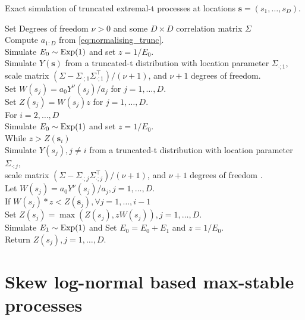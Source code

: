 \documentclass[lineno]{biometrika}
\begin{document}
\begin{algo}
\label{algo:trunc_extremal_t}
Exact simulation of truncated extremal-t processes at locations $\bm s = (s_1,\dots,s_D)$.
%
\begin{tabbing}
    \qquad \enspace Set Degrees of freedom $\nu>0$ and some $D\times D$ correlation matrix $\Sigma$ \\
    \qquad \enspace Compute $a_{1:D}$ from  \eqref{eq:normalising_trunc}. \\
    \qquad \enspace Simulate $E_0 \sim \rm{Exp}(1)$ and set $z=1/E_0$. \\    
    \qquad \enspace Simulate $Y(\bm s)$ from a truncated-t distribution with location parameter $\Sigma_{\cdot;1}$,\\ 
    \qquad \enspace scale matrix $(\Sigma - \Sigma_{\cdot;1}\Sigma_{\cdot;1}^\top)/(\nu+1)$, and $\nu+1$ degrees of freedom. \\
    \qquad \enspace Set $W(s_j) = a_0 Y^{\nu}(s_j)/a_j$ for $j=1,\dots,D$. \\
    \qquad \enspace Set $Z(s_j)=W(s_j)z$ for $j=1,\dots,D$. \\
    \qquad \enspace For {$i=2,\dots,D$} \\
    \qquad \qquad \enspace Simulate $E_0 \sim \rm{Exp}(1)$ and set $z=1/E_0$. \\
    \qquad \qquad \enspace While {$z > Z(\bm s_i)$} \\
    \qquad \qquad \qquad \enspace Simulate $Y(s_j),j\neq i$ from a truncated-t distribution with location parameter $\Sigma_{\cdot;j}$, \\
    \qquad \qquad \qquad \enspace scale matrix $(\Sigma - \Sigma_{\cdot;j}\Sigma_{\cdot;j}^\top)/(\nu+1)$, and $\nu+1$ degrees of freedom . \\
    \qquad \qquad \qquad \enspace Let $W(s_j) = a_0Y^{\nu}(s_j)/a_j,j=1,\dots,D$. \\
    \qquad \qquad \qquad \enspace If {$W(s_{j})*z < Z(\bm s_j), \forall j=1,\dots,i-1$} \\
    \qquad \qquad \qquad \qquad \enspace Set $Z(s_j)=\max(Z(s_j),zW(s_j)),j=1,\dots,D$. \\
    \qquad \qquad \qquad \enspace Simulate $E_1 \sim \rm{Exp}(1)$ and Set $E_0 = E_0 + E_1$ and $z=1/E_0$.\\
    \qquad \enspace Return $Z(s_j ),j=1,\dots,D$.
\end{tabbing}
\end{algo}

\section{Skew log-normal based max-stable processes}
\label{sec:skew-log-normal_appendix}
\end{document}
